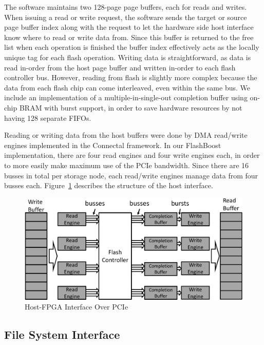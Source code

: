 The software maintains two 128-page page buffers, each for reads and writes. When
issuing a read or write request, the software sends the target or source page
buffer index along with the request to let the hardware side host interface know
where to read or write data from. Since this buffer is returned to the free list
when each operation is finished the buffer index effectively acts as the locally
unique tag for each flash operation. Writing data is straightforward, as data is
read in-order from the host page buffer and written in-order to each flash
controller bus. However, reading from flash is slightly more complex because the
data from each flash chip can come interleaved, even within the same bus. 
We include an implementation of a multiple-in-single-out completion buffer using
on-chip BRAM with burst support, in order to save hardware resources by not
having 128 separate FIFOs.

Reading or writing data from the host buffers were done by DMA read/write
engines implemented in the Connectal framework. In our FlashBoost
implementation, there are four read engines and four write engines each, in
order to more easily make maximum use of the PCIe bandwidth. Since there are 16
busses in total per storage node, each read/write engines manage data from four
busses each.
Figure~\ref{fig:hostinterface} describes the
structure of the host interface.

\begin{figure}[ht!]
	\centering
	\includegraphics[width=0.4	\textwidth]{figures/hostinterface-crop.pdf}
	\caption{Host-FPGA Interface Over PCIe}
	\label{fig:hostinterface}
\end{figure}


\subsection{File System Interface}

